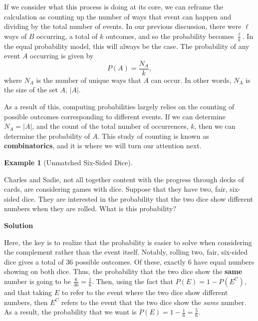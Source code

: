 \documentclass[
  letterpaper,
  DIV=11,
  numbers=noendperiod]{scrreprt}
\theoremstyle{definition}
\theoremstyle{definition}
\theoremstyle{definition}
\newtheorem{example}{Example}[chapter]
\theoremstyle{remark}
\begin{document}
If we consider what this process is doing at its core, we can reframe
the calculation as counting up the number of ways that event can happen
and dividing by the total number of events. In our previous discussion,
there were \(\ell\) ways of \(B\) occurring, a total of \(k\) outcomes,
and so the probability becomes \(\frac{\ell}{k}\). In the equal
probability model, this will always be the case. The probability of any
event \(A\) occurring is given by \[P(A) = \frac{N_A}{k},\] where
\(N_A\) is the number of unique ways that \(A\) can occur. In other
words, \(N_A\) is the size of the set \(A\), \(|A|\).

As a result of this, computing probabilities largely relies on the
counting of possible outcomes corresponding to different events. If we
can determine \(N_A = |A|\), and the count of the total number of
occurrences, \(k\), then we can determine the probability of \(A\). This
study of counting is known as \textbf{combinatorics}, and it is where we
will turn our attention next.

\begin{example}[Unmatched Six-Sided
Dice]\protect\hypertarget{exm-complement-trick}{}\label{exm-complement-trick}

Charles and Sadie, not all together content with the progress through
decks of cards, are considering games with dice. Suppose that they have
two, fair, six-sided dice. They are interested in the probability that
the two dice show different numbers when they are rolled. What is this
probability?

\begin{tcolorbox}[enhanced jigsaw, colback=white, breakable, rightrule=.15mm, leftrule=.75mm, toprule=.15mm, left=2mm, arc=.35mm, opacityback=0, bottomrule=.15mm]

\vspace{-3mm}\textbf{Solution}\vspace{3mm}

Here, the key is to realize that the probability is easier to solve when
considering the complement rather than the event itself. Notably,
rolling two, fair, six-sided dice gives a total of \(36\) possible
outcomes. Of these, exactly \(6\) have equal numbers showing on both
dice. Thus, the probability that the two dice show the \textbf{same}
number is going to be \(\frac{6}{36} = \frac{1}{6}\). Then, using the
fact that \(P(E) = 1 - P(E^C)\), and that taking \(E\) to refer to the
event where the two dice show different numbers, then \(E^C\) refers to
the event that the two dice show the \emph{same} number. As a result,
the probability that we want is
\(P(E) = 1 - \frac{1}{6} = \frac{5}{6}\).

\end{tcolorbox}

\end{example}
\end{document}
